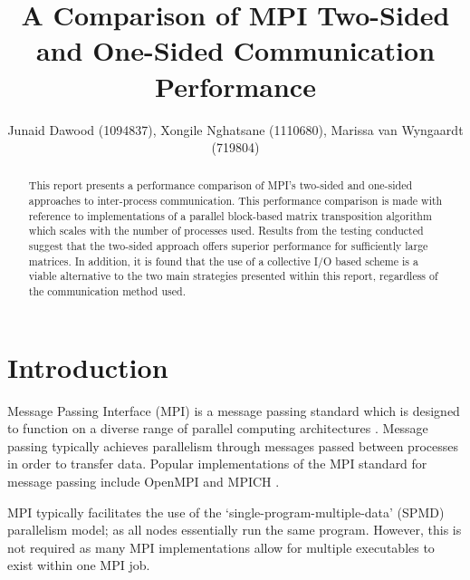 \documentclass[journal,10pt,a4paper]{IEEEtran}
\begin{document}
%
\title{A Comparison of MPI Two-Sided and One-Sided Communication Performance}

\author{Junaid Dawood (1094837), Xongile Nghatsane (1110680), Marissa van Wyngaardt (719804)}%



\maketitle


\begin{abstract}
This report presents a performance comparison of MPI's two-sided and one-sided approaches to inter-process communication. This performance comparison is made with reference to implementations of a parallel block-based matrix transposition algorithm which scales with the number of processes used. Results from the testing conducted suggest that the two-sided approach offers superior performance for sufficiently large matrices. In addition, it is found that the use of a collective I/O based scheme is a viable alternative to the two main strategies presented within this report, regardless of the communication method used.

\end{abstract}

\IEEEpeerreviewmaketitle

\section{Introduction}
Message Passing Interface (MPI) is a message passing standard which is designed to function on a diverse range of parallel computing architectures \cite{MPIAMess20:online}. Message passing typically achieves parallelism through messages passed between processes in order to transfer data. Popular implementations of the MPI standard for message passing include OpenMPI and MPICH \cite{ompi,mpich}.

MPI typically facilitates the use of the `single-program-multiple-data' (SPMD) parallelism model; as all nodes essentially run the same program. However, this is not required as many MPI implementations allow for multiple executables to exist within one MPI job. 
\end{document}
